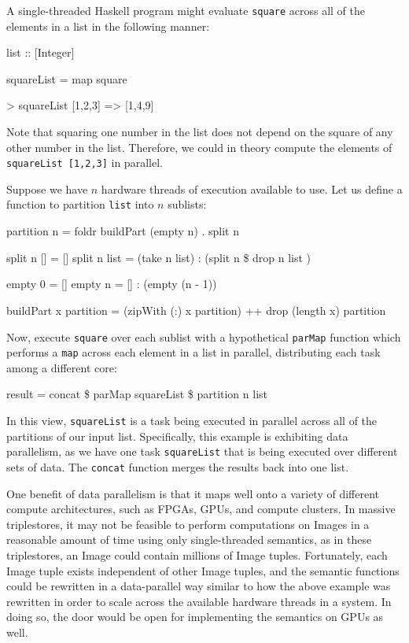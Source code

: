 \documentclass[../main.tex]{subfiles}
\begin{document}
A single-threaded Haskell program might evaluate \texttt{square} across all of the elements in a list in the following manner:

\begin{code}
	list :: [Integer]
	
	squareList = map square
	
	> squareList [1,2,3] => [1,4,9]
\end{code}

Note that squaring one number in the list does not depend on the square of any other number in the list.
Therefore, we could in theory compute the elements of \texttt{squareList [1,2,3]} in parallel.

Suppose we have $n$ hardware threads of execution available to use.  Let us define a function to partition \texttt{list} into $n$ sublists:

\begin{code}
	partition n = foldr buildPart (empty n) . split n
	
	split n [] = []
	split n list = (take n list) : (split n \$ drop n list )
	
	empty 0 = []
	empty n = [] : (empty (n - 1))
	
	buildPart x partition = (zipWith (:) x partition) ++ drop (length x) partition
	
\end{code}

Now, execute \texttt{square} over each sublist with a hypothetical \texttt{parMap} function which
performs a \texttt{map} across each element in a list in parallel, distributing each task among a different core:

\begin{code}
	result = concat \$ parMap squareList \$ partition n list
\end{code}

In this view, \texttt{squareList} is a task being executed in parallel across all of the partitions of our input list.
Specifically, this example is exhibiting data parallelism, as we have one task \texttt{squareList} that is being executed
over different sets of data.  The \texttt{concat} function merges the results back into one list.

One benefit of data parallelism is that it maps well onto a variety of different compute architectures, such as
FPGAs, GPUs, and compute clusters.  In massive triplestores, it may not be feasible to perform computations on
Images in a reasonable amount of time using only single-threaded semantics, as in these triplestores,
an Image could contain millions of Image tuples.  Fortunately, each Image tuple exists independent of other Image tuples, and 
the semantic functions could be rewritten in a data-parallel way similar to how the above example was rewritten
in order to scale across the available hardware threads in a system.  In doing so, the door would be open for implementing
the semantics on GPUs as well.
\end{document}
